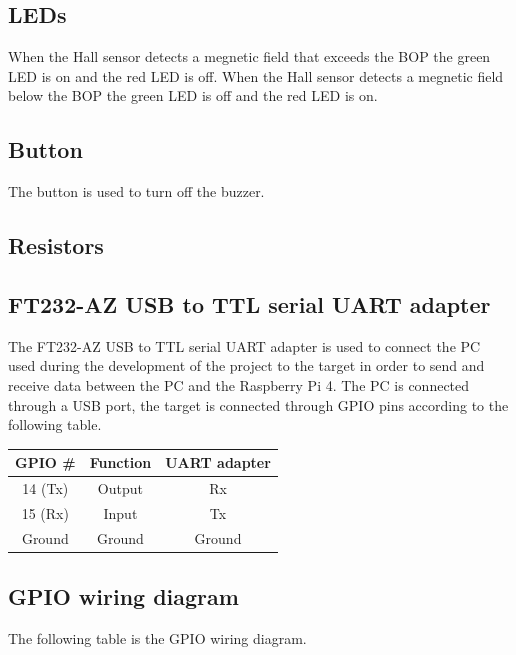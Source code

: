 \documentclass{article}
\begin{document}
\subsection{LEDs}
When the Hall sensor detects a megnetic field that exceeds the BOP the green LED is on and the red LED is off.
When the Hall sensor detects a megnetic field below the BOP the green LED is off and the red LED is on.

\subsection{Button}
The button is used to turn off the buzzer.

\subsection{Resistors}

\subsection{FT232-AZ USB to TTL serial UART adapter}
The FT232-AZ USB to TTL serial UART adapter is used to connect the PC used during the development of the project
to the target in order to send and receive data between the PC and the Raspberry Pi 4. 
The PC is connected through a USB port, the target is connected through GPIO pins according to the 
following table.

\begin{center}
    \begin{tabular}{ |c|c|c| } 
        \hline
        GPIO \# & Function & UART adapter  \\
        \hline
        14 (Tx) & Output & Rx \\ 
        15 (Rx) & Input & Tx \\ 
        Ground & Ground & Ground \\ 
        \hline
    \end{tabular}
\end{center}

\subsection{GPIO wiring diagram}
The following table is the GPIO wiring diagram.
\end{document}
